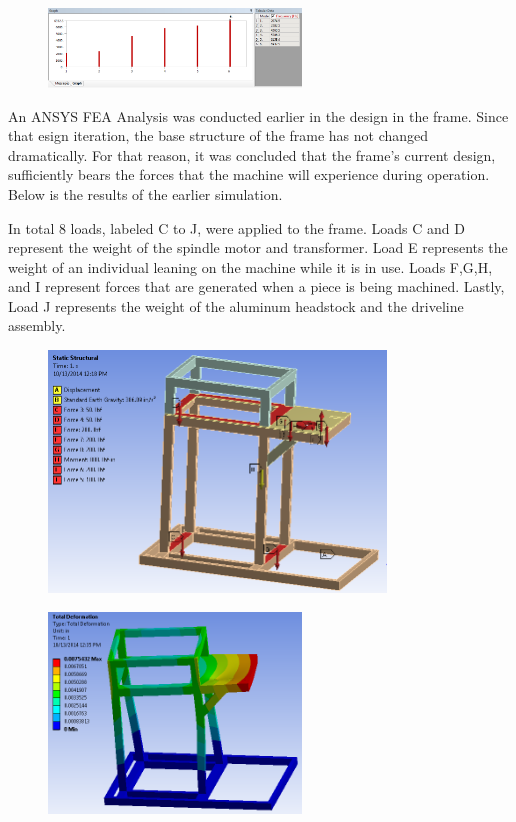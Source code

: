 \begin{figure}[H]
    \centering
    \includegraphics[width=0.6\textwidth]{./fall-report pictures/Chapter3-Calculations/AnsysMotorMount2}
    \label{fig:MM2}
\end{figure}

\newpage

An ANSYS FEA Analysis was conducted earlier in the design in the frame. Since that esign iteration, the base structure of the frame has not changed dramatically. For that reason, it was concluded that the frame's current design, sufficiently bears the forces that the machine will experience during operation. Below is the results of the earlier simulation.

In total 8 loads, labeled C to J, were applied to the frame. Loads C and D represent the weight of the spindle motor and transformer. Load E represents the weight of an individual leaning on the machine while it is in use.  Loads F,G,H, and I represent forces that are generated when a piece is being machined. Lastly, Load J represents the weight of the aluminum headstock and the driveline assembly. 

\begin{figure}[H]
    \centering
    \includegraphics[width=0.8\textwidth]{./fall-report pictures/Chapter3-Calculations/lp1}
    \label{fig:MM2}
\end{figure}

\begin{figure}[H]
    \centering
    \includegraphics[width=0.6\textwidth]{./fall-report pictures/Chapter3-Calculations/mp1}
    \label{fig:MM2}
\end{figure}

